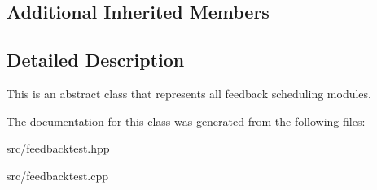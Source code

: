 \subsection*{Additional Inherited Members}


\subsection{Detailed Description}
This is an abstract class that represents all feedback scheduling modules. 

The documentation for this class was generated from the following files\+:\begin{DoxyCompactItemize}
\item 
src/feedbacktest.\+hpp\item 
src/feedbacktest.\+cpp\end{DoxyCompactItemize}
